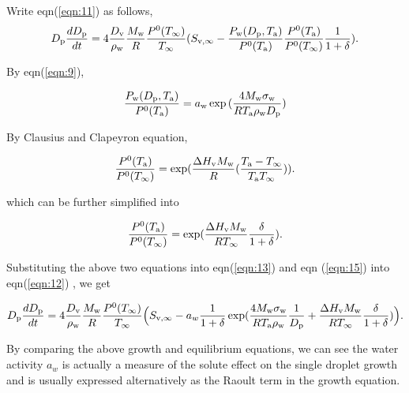 \documentclass[12pt]{article}
\begin{document}
Write eqn(\ref{eqn:11}) as follows,
\begin{equation}\label{eqn:12}
D_{\rm p}\frac{dD_{\rm p}}{dt}=4 \frac{D_{\rm v}} {\rho_{\rm w}} \frac{M_{\rm w}}{R} \frac{P^{\rm 0}(T_{\infty})} {T_{\infty}} (S_{\rm v, \infty} - \frac{P_{\rm w}(D_{\rm p}, T_{\rm a})}{P^{\rm 0}(T_{\rm a})} \frac{P^{\rm 0}(T_{\rm a})}{P^{\rm 0}(T_{\infty})}\frac{1}{1+\delta}).
\end{equation}

By eqn(\ref{eqn:9}), 

\begin{equation}\label{eqn:13}
\frac{P_{\rm w}(D_{\rm p}, T_{\rm a})}{P^{\rm 0}(T_{\rm a})}=a_{\rm w}\exp{(\frac{4 M_{\rm w} \sigma_{\rm w}}{R T_{\rm a} \rho_{\rm w}D_{\rm p}})}\end{equation}

By Clausius and Clapeyron equation,

\begin{equation}\label{eqn:14}
\frac{P^{\rm 0}(T_{\rm a})}{P^{\rm 0}(T_{\infty})}=\exp (\frac{\Delta H_{\rm v} M_{\rm w}}{R} (\frac{T_{\rm a}-T_{\infty}}{T_{\rm a} T_{\infty}})).
\end{equation}

which can be further simplified into 

\begin{equation}\label{eqn:15}
\frac{P^{\rm 0}(T_{\rm a})}{P^{\rm 0}(T_{\infty})}=\exp (\frac{\Delta H_{\rm v} M_{\rm w}}{R T_{\infty}} \frac{\delta}{1+\delta}).
\end{equation}

Substituting the above two equations into eqn(\ref{eqn:13}) and eqn (\ref{eqn:15}) into eqn(\ref{eqn:12}) , we get

\begin{equation}\label{eqn:16}
D_{\rm p}\frac{dD_{\rm p}}{dt}=4 \frac{D_{\rm v}} {\rho_{\rm w}} \frac{M_{\rm w}}{R} \frac{P^{\rm 0}(T_{\infty})} {T_{\infty}} \Big(S_{\rm v, \infty} - a_{w} \frac{1}{1+\delta} \exp(\frac{4 M_{\rm w}\sigma_{\rm w}}{R T_{\rm a} \rho_{\rm w}}\frac{1}{D_{\rm p}}+\frac{\Delta H_{\rm v} M_{\rm w}}{R T_{\infty}} \frac{\delta}{1+\delta})\Big).
\end{equation}

By comparing the above growth and equilibrium equations, we can see the water activity $a_{w}$ is actually a measure of the solute effect on the single droplet growth and is usually expressed alternatively as the Raoult term in the growth equation.

\end{document}
